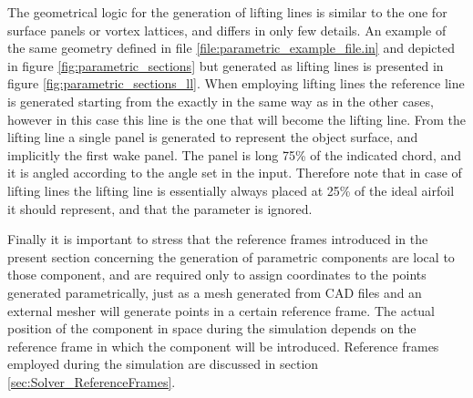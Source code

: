 The geometrical logic for the generation of lifting lines is similar to the one for surface panels 
or vortex lattices, and differs in only few details. An example of the same geometry defined in 
file \ref{file:parametric_example_file.in} and depicted in figure \ref{fig:parametric_sections} 
but generated as lifting lines is presented in figure \ref{fig:parametric_sections_ll}. 
When employing lifting lines the reference line is generated starting from the 
 exactly in the same way as in the other cases, however 
in this case this line is the one that will become the lifting line. From the lifting 
line a single panel is generated to represent the object surface, and implicitly the 
first wake panel. The panel is long 75\% of the indicated chord, and it is angled according 
to the  angle set in the input. Therefore note that in case of lifting lines the 
lifting line is essentially always placed at 25\% of the ideal airfoil it should represent, 
and that the parameter  is ignored. 

Finally it is important to stress that the reference frames introduced in the present section 
concerning the generation of parametric components are local to those component, and are required 
only to assign coordinates to the points generated parametrically, just as a mesh generated from 
CAD files and an external mesher will generate points in a certain reference frame. 
The actual position of the component in space during the simulation depends on the reference 
frame in which the component will be introduced. Reference frames employed during the simulation 
are discussed in section \ref{sec:Solver_ReferenceFrames}.

